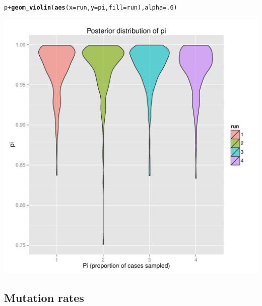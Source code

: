 \documentclass{article}\usepackage[]{graphicx}\usepackage[]{color}
\makeatletter
\newcommand{\hlnum}[1]{\textcolor[rgb]{0.686,0.059,0.569}{#1}}%
\newcommand{\hlopt}[1]{\textcolor[rgb]{0,0,0}{#1}}%
\newcommand{\hlstd}[1]{\textcolor[rgb]{0.345,0.345,0.345}{#1}}%
\newcommand{\hlkwc}[1]{\textcolor[rgb]{0.333,0.667,0.333}{#1}}%
\newcommand{\hlkwd}[1]{\textcolor[rgb]{0.737,0.353,0.396}{\textbf{#1}}}%
\newenvironment{kframe}{%
 \def\at@end@of@kframe{}%
 \ifinner\ifhmode%
  \def\at@end@of@kframe{\end{minipage}}%
  \begin{minipage}{\columnwidth}%
 \fi\fi%
 \def\FrameCommand##1{\hskip\@totalleftmargin \hskip-\fboxsep
 \colorbox{shadecolor}{##1}\hskip-\fboxsep
     \hskip-\linewidth \hskip-\@totalleftmargin \hskip\columnwidth}%
 \MakeFramed {\advance\hsize-\width
   \@totalleftmargin\z@ \linewidth\hsize
   \@setminipage}}%
 {\par\unskip\endMakeFramed%
 \at@end@of@kframe}
\newenvironment{knitrout}{}{} %
\makeatother
\begin{document}
\begin{knitrout}
\color{fgcolor}\begin{kframe}
\begin{alltt}
\hlstd{p} \hlopt{+} \hlkwd{geom_violin}\hlstd{(}\hlkwd{aes}\hlstd{(}\hlkwc{x}\hlstd{=run,} \hlkwc{y}\hlstd{=pi,} \hlkwc{fill}\hlstd{=run),}\hlkwc{alpha}\hlstd{=}\hlnum{.6}\hlstd{)}
\end{alltt}
\end{kframe}

{\centering \includegraphics[width=.6\textwidth]{figs/unnamed-chunk-36} 

}



\end{knitrout}






\subsection{Mutation rates}
\end{document}
